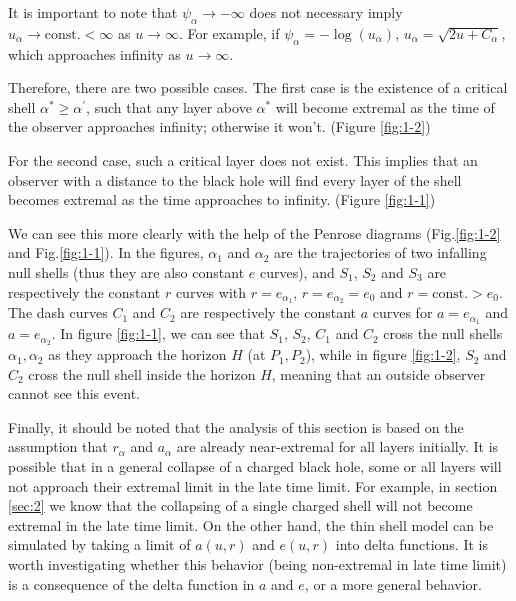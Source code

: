 \documentclass[letterpaper,12pt]{article}
\begin{document}
It is important to note that $\psi_{\alpha} \rightarrow -\infty$ does not necessary imply $u_{\alpha} \rightarrow \textrm{const.} < \infty$ as $u \rightarrow \infty$. For example, if $\psi_{\alpha} = -\log(u_{\alpha})$, $u_{\alpha} = \sqrt{2u+C_{\alpha}}$, which approaches infinity as $u \rightarrow \infty$.

Therefore, there are two possible cases. The first case is the existence of a critical shell $\alpha^{*} \geq \alpha^{\prime}$, such that any layer above $ \alpha^{*}$ will become extremal as the time of the observer approaches infinity; otherwise it won't. (Figure \ref{fig:1-2})

For the second case, such a critical layer does not exist. This implies that an observer with a distance to the black hole will find every layer of the shell becomes extremal as the time approaches to infinity. (Figure \ref{fig:1-1})

We can see this more clearly with the help of the Penrose diagrams (Fig.\ref{fig:1-2} and Fig.\ref{fig:1-1}). In the figures, $\alpha_{1}$ and $\alpha_{2}$ are the trajectories of two infalling null shells (thus they are also constant $e$ curves), and $S_{1}$, $S_{2}$ and $S_{3}$ are respectively the constant $r$ curves with $r = e_{\alpha_{1}}$, $r=e_{\alpha_{2}} = e_{0}$ and $r = \textrm{const.} > e_{0}$. The dash curves $C_{1}$ and $C_{2}$ are respectively the constant $a$ curves for $a = e_{\alpha_{1}}$ and $a = e_{\alpha_{2}}$. In figure \ref{fig:1-1}, we can see that $S_{1}$, $S_{2}$, $C_{1}$ and $C_{2}$ cross the null shells $\alpha_{1}, \alpha_{2}$ as they approach the horizon $H$ (at $P_{1}, P_{2}$), while in figure \ref{fig:1-2}, $S_{2}$ and $C_{2}$ cross the null shell inside the horizon $H$, meaning that an outside observer cannot see this event.

Finally, it should be noted that the analysis of this section is based on the assumption that $r_{\alpha}$ and $a_{\alpha}$ are already near-extremal for all layers initially. It is possible that in a general collapse of a charged black hole, some or all layers will not approach their extremal limit in the late time limit. For example, in section \ref{sec:2} we know that the collapsing of a single charged shell will not become extremal in the late time limit. On the other hand, the thin shell model can be simulated by taking a limit of $a(u, r)$ and $e(u, r)$ into delta functions. It is worth investigating whether this behavior (being non-extremal in late time limit) is a consequence of the delta function in $a$ and $e$, or a more general behavior.
\end{document}
